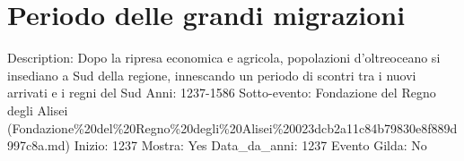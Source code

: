 \section{Periodo delle grandi
migrazioni}\label{periodo-delle-grandi-migrazioni}

Description: Dopo la ripresa economica e agricola, popolazioni
d'oltreoceano si insediano a Sud della regione, innescando un periodo di
scontri tra i nuovi arrivati e i regni del Sud Anni: 1237-1586
Sotto-evento: Fondazione del Regno degli Alisei
(Fondazione\%20del\%20Regno\%20degli\%20Alisei\%20023dcb2a11c84b79830e8f889d997c8a.md)
Inizio: 1237 Mostra: Yes Data\_da\_anni: 1237 Evento Gilda: No
